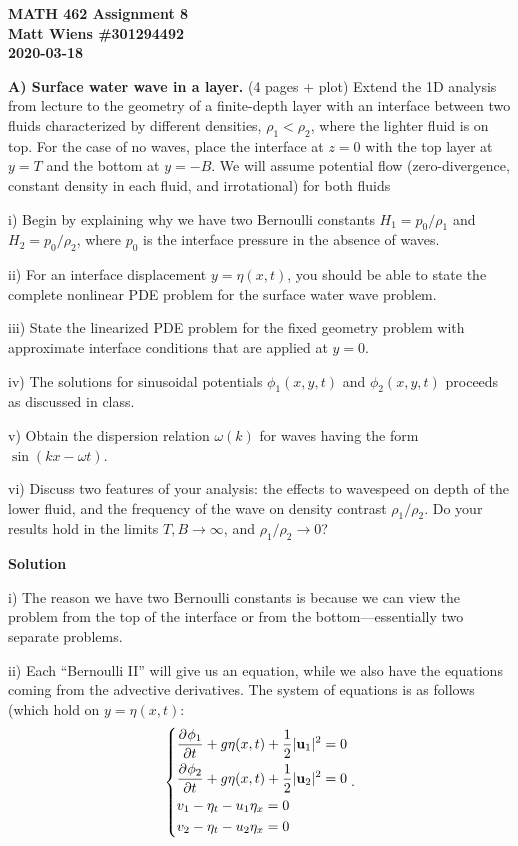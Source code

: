 \documentclass{article}
\def\*#1{\mathbf{#1}}
\begin{document}
\textbf{MATH 462 Assignment 8} \\
\textbf{Matt Wiens \#301294492} \\
\textbf{2020-03-18}

\textbf{A) Surface water wave in a layer.} (4 pages + plot)
Extend the 1D analysis from lecture to the geometry of a finite-depth
layer with an interface between two fluids characterized by different
densities, $\rho_1 < \rho_2$, where the lighter fluid is on top. For
the case of no waves, place the interface at $z = 0$ with the top layer
at $y = T$ and the bottom at $y = -B$. We will assume potential flow
(zero-divergence, constant density in each fluid, and irrotational) for
both fluids

i) Begin by explaining why we have two Bernoulli constants
$H_1 = p_0 / \rho_1$ and $H_2 = p_0 / \rho_2$, where $p_0$ is the
interface pressure in the absence of waves.

ii) For an interface displacement $y = \eta(x, t)$, you should be able
to state the complete nonlinear PDE problem for the surface water wave
problem.

iii) State the linearized PDE problem for the fixed geometry problem with
approximate interface conditions that are applied at $y = 0$.

iv) The solutions for sinusoidal potentials $\phi_1(x, y, t)$ and
$\phi_2(x, y, t)$ proceeds as discussed in class.

v) Obtain the dispersion relation $\omega(k)$ for waves having the form
$\sin(k x - \omega t)$.

vi) Discuss two features of your analysis: the effects to wavespeed on depth
of the lower fluid, and the frequency of the wave on density contrast
$\rho_1 / \rho_2$. Do your results hold in the limits $T, B \to \infty$,
and $\rho_1 / \rho_2 \to 0$?

\newpage

\textbf{Solution}

i) The reason we have two Bernoulli constants is because we can view the
problem from the top of the interface or from the bottom---essentially
two separate problems.

ii) Each ``Bernoulli II'' will give us an equation, while we also have
the equations coming from the advective derivatives. The system of
equations is as follows (which hold on $y = \eta(x, t)$:
%
\begin{equation*}
    \begin{dcases}
        \dpd{\phi_1}{t} + g \eta(x, t) + \frac{1}{2} |\*u_1|^2 = 0 \\
        \dpd{\phi_2}{t} + g \eta(x, t) + \frac{1}{2} |\*u_2|^2 = 0 \\
        v_1 - \eta_t - u_1 \eta_x = 0 \\
        v_2 - \eta_t - u_2 \eta_x = 0
    \end{dcases}
    .
\end{equation*}
\end{document}
